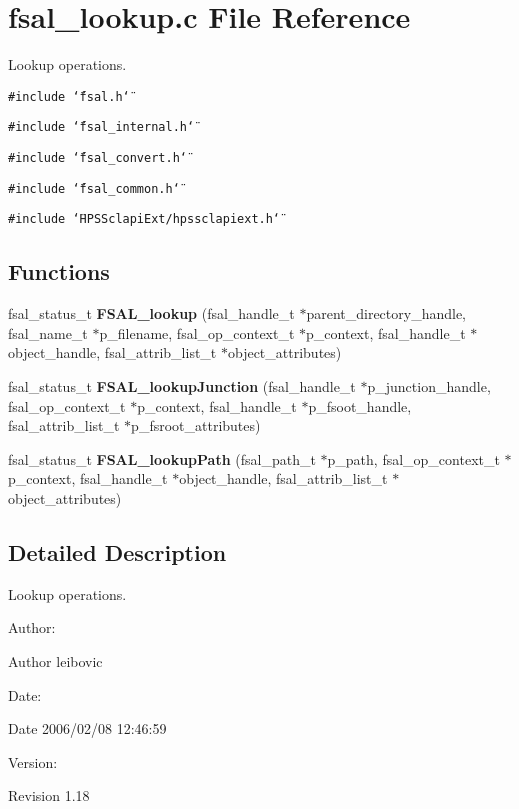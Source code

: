 \section{fsal\_\-lookup.c File Reference}
\label{fsal__lookup_8c}
Lookup operations.  


{\tt \#include \char`\"{}fsal.h\char`\"{}}\par
{\tt \#include \char`\"{}fsal\_\-internal.h\char`\"{}}\par
{\tt \#include \char`\"{}fsal\_\-convert.h\char`\"{}}\par
{\tt \#include \char`\"{}fsal\_\-common.h\char`\"{}}\par
{\tt \#include \char`\"{}HPSSclapiExt/hpssclapiext.h\char`\"{}}\par
\subsection*{Functions}
\begin{CompactItemize}
\item 
fsal\_\-status\_\-t {\bf FSAL\_\-lookup} (fsal\_\-handle\_\-t $\ast$parent\_\-directory\_\-handle, fsal\_\-name\_\-t $\ast$p\_\-filename, fsal\_\-op\_\-context\_\-t $\ast$p\_\-context, fsal\_\-handle\_\-t $\ast$object\_\-handle, fsal\_\-attrib\_\-list\_\-t $\ast$object\_\-attributes)
\item 
fsal\_\-status\_\-t {\bf FSAL\_\-lookupJunction} (fsal\_\-handle\_\-t $\ast$p\_\-junction\_\-handle, fsal\_\-op\_\-context\_\-t $\ast$p\_\-context, fsal\_\-handle\_\-t $\ast$p\_\-fsoot\_\-handle, fsal\_\-attrib\_\-list\_\-t $\ast$p\_\-fsroot\_\-attributes)
\item 
fsal\_\-status\_\-t {\bf FSAL\_\-lookupPath} (fsal\_\-path\_\-t $\ast$p\_\-path, fsal\_\-op\_\-context\_\-t $\ast$p\_\-context, fsal\_\-handle\_\-t $\ast$object\_\-handle, fsal\_\-attrib\_\-list\_\-t $\ast$object\_\-attributes)
\end{CompactItemize}


\subsection{Detailed Description}
Lookup operations. 

\begin{Desc}
\item[Author:]\end{Desc}
\begin{Desc}
\item[Author]leibovic \end{Desc}
\begin{Desc}
\item[Date:]\end{Desc}
\begin{Desc}
\item[Date]2006/02/08 12:46:59 \end{Desc}
\begin{Desc}
\item[Version:]\end{Desc}
\begin{Desc}
\item[Revision]1.18 \end{Desc}


